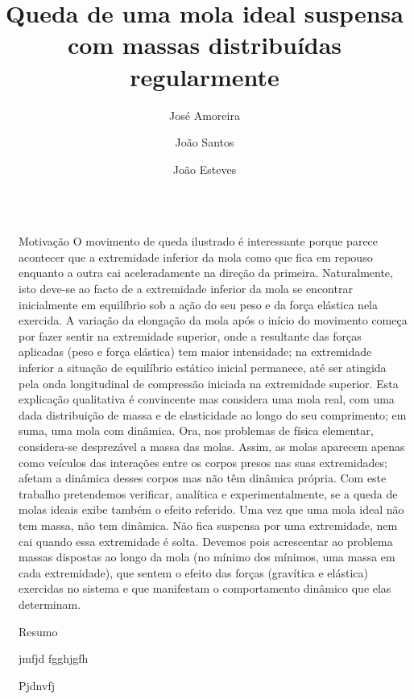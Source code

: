 \documentclass[final]{beamer}
\title{Queda de uma mola ideal suspensa com massas distribuídas regularmente}
\author{José Amoreira \inst{1,2} \and João Santos \inst{1} \and João Esteves \inst{1}}
\institute[]{\inst{1}Universidade da Beira Interior \samelineand \inst{2} Centro de Matemática e Aplicações}
\newlength{\sepwidth}
\newlength{\colwidth}
\newcommand{\separatorcolumn}{\begin{column}{\sepwidth}\end{column}}
\begin{document}
\begin{frame}[t]
\begin{columns}[t]
\separatorcolumn

\begin{column}{\colwidth}

  \begin{block}{Motivação}
    O movimento de queda ilustrado é interessante
    porque parece acontecer que a extremidade inferior da mola como que fica em repouso enquanto a outra cai aceleradamente na direção da primeira. Naturalmente, isto deve-se ao facto de a extremidade inferior da mola se encontrar inicialmente em equilíbrio sob a ação do seu peso e da força elástica nela exercida. A variação da elongação da mola após o início do movimento começa por fazer sentir na extremidade superior, onde a resultante das forças aplicadas (peso e força elástica) tem maior intensidade; na extremidade inferior a situação de equilíbrio estático inicial permanece, até ser atingida pela onda longitudinal de compressão iniciada na extremidade superior.
    Esta explicação qualitativa é convincente mas considera uma mola real, com uma dada distribuição de massa e de elasticidade ao longo do seu comprimento; em suma, uma mola com dinâmica. Ora, nos problemas de física elementar, considera-se desprezável a massa das molas. Assim, as molas aparecem apenas como veículos das interações entre os corpos presos nas suas extremidades; afetam a dinâmica desses corpos mas não têm dinâmica própria. Com este trabalho
    pretendemos verificar, analítica e experimentalmente, se a queda de molas ideais exibe também o efeito referido.
    Uma vez que uma mola ideal não tem massa, não tem dinâmica. Não fica suspensa por uma extremidade, nem cai quando essa extremidade é solta. Devemos pois acrescentar ao problema massas dispostas ao longo da mola (no mínimo dos mínimos, uma massa em cada extremidade), que sentem o efeito das forças (gravítica e elástica) exercidas no sistema e que manifestam o comportamento dinâmico que elas determinam.
  \end{block}
  
  \begin{alertblock}{Resumo}

    jmfjd fgghjgfh

    Pjdnvfj

  \end{alertblock}


\end{column}
\end{columns}
\end{frame}
\end{document}
